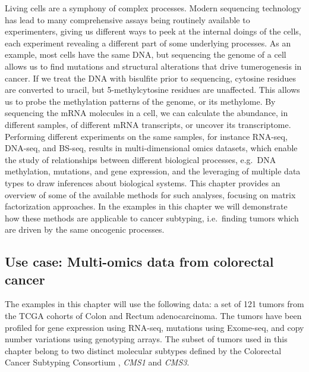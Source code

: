 \documentclass[12pt,]{krantz}
\begin{document}
Living cells are a symphony of complex processes. Modern sequencing technology has lead to many comprehensive assays being routinely available to experimenters, giving us different ways to peek at the internal doings of the cells, each experiment revealing a different part of some underlying processes. As an example, most cells have the same DNA, but sequencing the genome of a cell allows us to find mutations and structural alterations that drive tumerogenesis in cancer. If we treat the DNA with bisulfite prior to sequencing, cytosine residues are converted to uracil, but 5-methylcytosine residues are unaffected. This allows us to probe the methylation patterns of the genome, or its methylome. By sequencing the mRNA molecules in a cell, we can calculate the abundance, in different samples, of different mRNA transcripts, or uncover its transcriptome. Performing different experiments on the same samples, for instance RNA-seq, DNA-seq, and BS-seq, results in multi-dimensional omics datasets, which enable the study of relationships between different biological processes, e.g.~DNA methylation, mutations, and gene expression, and the leveraging of multiple data types to draw inferences about biological systems. This chapter provides an overview of some of the available methods for such analyses, focusing on matrix factorization approaches. In the examples in this chapter we will demonstrate how these methods are applicable to cancer subtyping, i.e.~finding tumors which are driven by the same oncogenic processes.

\hypertarget{use-case-multi-omics-data-from-colorectal-cancer}{%
\subsection{Use case: Multi-omics data from colorectal cancer}\label{use-case-multi-omics-data-from-colorectal-cancer}}

The examples in this chapter will use the following data: a set of 121 tumors from the TCGA \citep{tcga_pan_cancer} cohorts of Colon and Rectum adenocarcinoma. The tumors have been profiled for gene expression using RNA-seq, mutations using Exome-seq, and copy number variations using genotyping arrays. The subset of tumors used in this chapter belong to two distinct molecular subtypes defined by the Colorectal Cancer Subtyping Consortium \citep{cmscc}, \emph{CMS1} and \emph{CMS3}.
\end{document}
